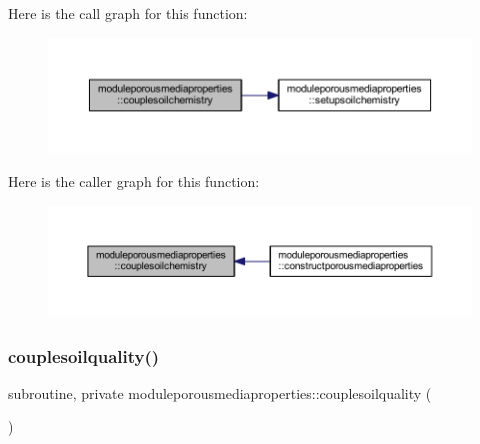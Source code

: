 Here is the call graph for this function\+:\nopagebreak
\begin{figure}[H]
\begin{center}
\leavevmode
\includegraphics[width=350pt]{namespacemoduleporousmediaproperties_aee3bf1633a5fbeea01e36455f4b4559c_cgraph}
\end{center}
\end{figure}
Here is the caller graph for this function\+:\nopagebreak
\begin{figure}[H]
\begin{center}
\leavevmode
\includegraphics[width=350pt]{namespacemoduleporousmediaproperties_aee3bf1633a5fbeea01e36455f4b4559c_icgraph}
\end{center}
\end{figure}
\mbox{\label{namespacemoduleporousmediaproperties_a61f775b3725813d36065a3b82e4cdb20}} 
\subsubsection{\texorpdfstring{couplesoilquality()}{couplesoilquality()}}
{\footnotesize\ttfamily subroutine, private moduleporousmediaproperties\+::couplesoilquality (\begin{DoxyParamCaption}{ }\end{DoxyParamCaption})\hspace{0.3cm}{\ttfamily [private]}}

